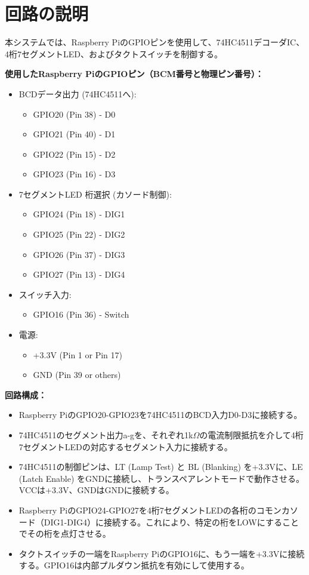 \documentclass[a4paper,11pt,dvipdfmx]{jsarticle}
\begin{document}
\section{回路の説明}
本システムでは、Raspberry PiのGPIOピンを使用して、74HC4511デコーダIC、4桁7セグメントLED、およびタクトスイッチを制御する。

\textbf{使用したRaspberry PiのGPIOピン（BCM番号と物理ピン番号）：}
\begin{itemize}
    \item BCDデータ出力 (74HC4511へ):
    \begin{itemize}
        \item GPIO20 (Pin 38) - D0
        \item GPIO21 (Pin 40) - D1
        \item GPIO22 (Pin 15) - D2
        \item GPIO23 (Pin 16) - D3
    \end{itemize}
    \item 7セグメントLED 桁選択 (カソード制御):
    \begin{itemize}
        \item GPIO24 (Pin 18) - DIG1
        \item GPIO25 (Pin 22) - DIG2
        \item GPIO26 (Pin 37) - DIG3
        \item GPIO27 (Pin 13) - DIG4
    \end{itemize}
    \item スイッチ入力:
    \begin{itemize}
        \item GPIO16 (Pin 36) - Switch
    \end{itemize}
    \item 電源:
    \begin{itemize}
        \item +3.3V (Pin 1 or Pin 17)
        \item GND (Pin 39 or others)
    \end{itemize}
\end{itemize}

\textbf{回路構成：}
\begin{itemize}
    \item Raspberry PiのGPIO20-GPIO23を74HC4511のBCD入力D0-D3に接続する。
    \item 74HC4511のセグメント出力a-gを、それぞれ1k$\Omega$の電流制限抵抗を介して4桁7セグメントLEDの対応するセグメント入力に接続する。
    \item 74HC4511の制御ピンは、LT (Lamp Test) と BL (Blanking) を+3.3Vに、LE (Latch Enable) をGNDに接続し、トランスペアレントモードで動作させる。VCCは+3.3V、GNDはGNDに接続する。
    \item Raspberry PiのGPIO24-GPIO27を4桁7セグメントLEDの各桁のコモンカソード（DIG1-DIG4）に接続する。これにより、特定の桁をLOWにすることでその桁を点灯させる。
    \item タクトスイッチの一端をRaspberry PiのGPIO16に、もう一端を+3.3Vに接続する。GPIO16は内部プルダウン抵抗を有効にして使用する。
\end{itemize}
\end{document}
